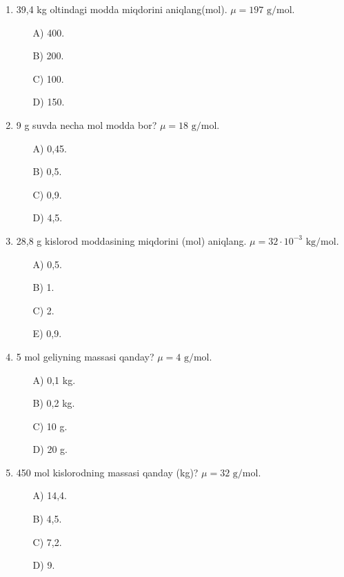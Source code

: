 \begin{enumerate}
\begin{itemize}
    \end{itemize}

    \item 39,4 kg oltindagi modda miqdorini aniqlang(mol). $\mu = 197 \text{ g/mol}$.
    \begin{itemize}
        \item[A)] 400.
        \item[B)] 200.
        \item[C)] 100.
        \item[D)] 150.
        
    \end{itemize}

    \item 9 g suvda necha mol modda bor? $\mu = 18 \text{ g/mol}$. 
    \begin{itemize}
        \item[A)] 0,45.
        \item[B)] 0,5.
        \item[C)] 0,9.
        \item[D)] 4,5.
        
    \end{itemize}

    \item 28,8 g kislorod moddasining miqdorini (mol) aniqlang. $\mu = 32 \cdot 10^{-3} \text{ kg/mol}$.
    \begin{itemize}
        \item[A)] 0,5.
        \item[B)] 1.
        \item[C)] 2.
        \item[E)] 0,9.
    \end{itemize}

    \item 5 mol geliyning massasi qanday? $\mu = 4 \text{ g/mol}$.
    \begin{itemize}
        \item[A)] 0,1 kg.
        \item[B)] 0,2 kg.
        \item[C)] 10 g.
        \item[D)] 20 g.
        
    \end{itemize}

    \item 450 mol kislorodning massasi qanday (kg)? $\mu = 32 \text{ g/mol}$.
    \begin{itemize}
        \item[A)] 14,4.
        \item[B)] 4,5.
        \item[C)] 7,2.
        \item[D)] 9.
        

\end{itemize}
\end{enumerate}
